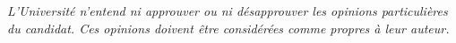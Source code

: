 \begin{vcenterpage}
\begin{flushleft}
\textit{L'Université n'entend ni approuver ou ni désapprouver les opinions particulières du candidat. Ces opinions doivent être considérées comme propres à leur auteur.} 
\end{flushleft}   
\end{vcenterpage}
